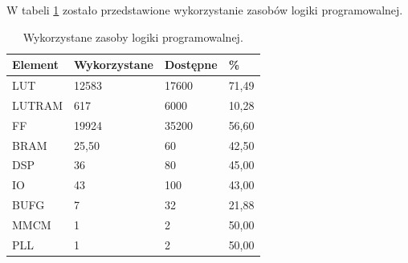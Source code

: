 W tabeli \ref{tab:fpgautilization} zostało przedstawione wykorzystanie zasobów logiki programowalnej. 
\begin{table}[]
\centering
\caption{Wykorzystane zasoby logiki programowalnej.}
\label{tab:fpgautilization}
\begin{tabular}{|l|l|l|l|}
\hline
Element & Wykorzystane & Dostępne & \% \\ \hline %
LUT & 12583 & 17600 & 71,49 \\ \hline 
LUTRAM & 617 & 6000 & 10,28 \\ \hline 
FF & 19924 & 35200 & 56,60 \\ \hline
BRAM & 25,50 & 60 & 42,50 \\ \hline
DSP & 36 & 80 & 45,00 \\ \hline
IO & 43 & 100 & 43,00 \\ \hline
BUFG & 7 & 32 & 21,88 \\ \hline
MMCM & 1 & 2 & 50,00 \\ \hline
PLL & 1 & 2 & 50,00 \\ \hline
\end{tabular}
\end{table}

